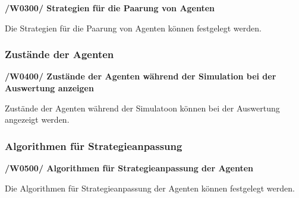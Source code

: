 \textbf{/W0300/ Strategien für die Paarung von Agenten}

Die Strategien für die Paarung von Agenten können festgelegt werden.

\subsubsection{Zustände der Agenten}

\textbf{/W0400/ Zustände der Agenten während der Simulation bei der Auswertung anzeigen}

Zustände der Agenten während der Simulatoon können bei der Auswertung angezeigt werden.

\subsubsection{Algorithmen für Strategieanpassung}

\textbf{/W0500/ Algorithmen für Strategieanpassung der Agenten}

Die Algorithmen für Strategieanpassung der Agenten können festgelegt werden.